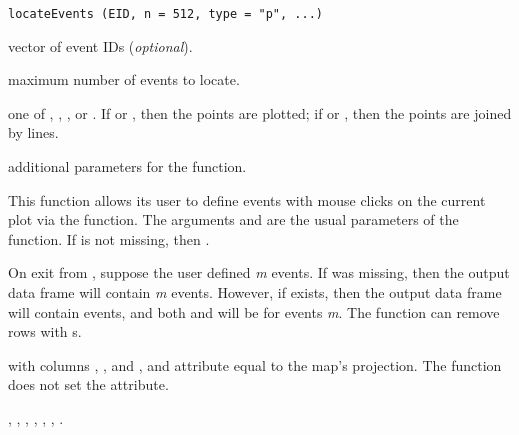 \documentclass[letterpaper]{book}
\begin{document}
%
\begin{Usage}
\begin{verbatim}
locateEvents (EID, n = 512, type = "p", ...)
\end{verbatim}
\end{Usage}
%
\begin{Arguments}
\begin{ldescription}
\item[\code{EID}] vector of event IDs (\emph{optional}).
\item[\code{n}] maximum number of events to locate.
\item[\code{type}] one of , , , or
. If  or , then the points are
plotted; if  or , then the points are joined by
lines.
\item[\code{...}] additional  parameters for the
 function.
\end{ldescription}
\end{Arguments}
%
\begin{Details}\relax
This function allows its user to define events with mouse clicks on
the current plot via the  function.  The
arguments  and  are the usual parameters of the
 function.  If  is not missing, then
.

On exit from , suppose the user defined \emph{m}
events.  If  was missing, then the output data frame will
contain \emph{m} events. However, if  exists, then the
output data frame will contain  events, and both
 and  will be  for events
\code{EID[(}\emph{m}\code{+1):n]}.  The  function
can remove rows with s.
\end{Details}
%
\begin{Value}
 with columns , , and , and
 attribute equal to the map's projection.  The
function does not set the  attribute.
\end{Value}
%
\begin{SeeAlso}\relax
{},
,
,
,
,
,
.
\end{SeeAlso}
\end{document}
